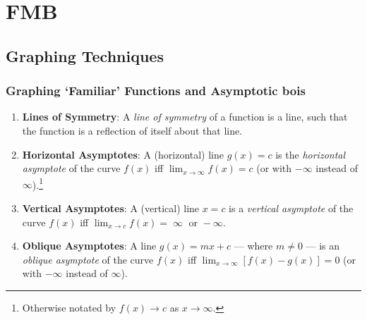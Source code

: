 \documentclass[oneside]{book}
\begin{document}
\part{FMB}
\chapter{Graphing Techniques}
\section{Graphing `Familiar' Functions and Asymptotic bois}

\begin{definition*}{}{}
  \begin{enumerate}
    \item \textbf{Lines of Symmetry}: A \emph{line of symmetry} of a function is a line, such that the function is a reflection of itself about that line.
    \item \textbf{Horizontal Asymptotes}: A (horizontal) line \(g(x)=c\) is the \emph{horizontal asymptote} of the curve \(f(x)\) iff \(\lim_{x \to \infty}{f(x)}=c\) (or with \(-\infty\) instead of \(\infty\)).\footnote{Otherwise notated by \(f(x) \to c\) as \(x \to \infty\).}
    \item \textbf{Vertical Asymptotes}: A (vertical) line \(x=c\) is a \emph{vertical asymptote} of the curve \(f(x)\) iff \(\lim_{x \to c}{f(x)}=\operatorname{\infty} \text{ or } -\infty\).
    \item \textbf{Oblique Asymptotes}: A line \(g(x)=mx+c\) --- where \(m \neq 0\) --- is an \emph{oblique asymptote} of the curve \(f(x)\) iff \(\lim_{x \to \infty}[f(x)-g(x)]=0\) (or with \(-\infty\) instead of \(\infty\)).
\end{enumerate}
\end{definition*}
\end{document}
